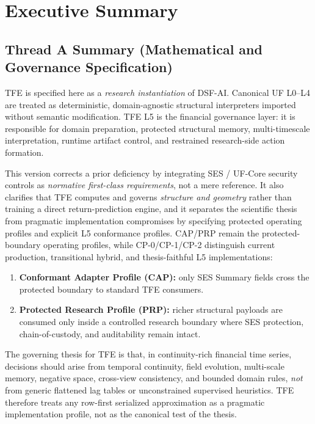 \documentclass[11pt]{report}
\begin{document}
\tableofcontents
\clearpage

\chapter*{Executive Summary}

\section*{Thread A Summary (Mathematical and Governance Specification)}
TFE is specified here as a \emph{research instantiation} of DSF-AI. Canonical UF L0--L4 are treated as deterministic, domain-agnostic structural interpreters imported without semantic modification. TFE L5 is the financial governance layer: it is responsible for domain preparation, protected structural memory, multi-timescale interpretation, runtime artifact control, and restrained research-side action formation.

This version corrects a prior deficiency by integrating SES / UF-Core security controls as \emph{normative first-class requirements}, not a mere reference. It also clarifies that TFE computes and governs \emph{structure and geometry} rather than training a direct return-prediction engine, and it separates the scientific thesis from pragmatic implementation compromises by specifying protected operating profiles and explicit L5 conformance profiles. CAP/PRP remain the protected-boundary operating profiles, while CP-0/CP-1/CP-2 distinguish current production, transitional hybrid, and thesis-faithful L5 implementations:
\begin{enumerate}[leftmargin=1.2cm]
    \item \textbf{Conformant Adapter Profile (CAP):} only SES Summary fields cross the protected boundary to standard TFE consumers.
    \item \textbf{Protected Research Profile (PRP):} richer structural payloads are consumed only inside a controlled research boundary where SES protection, chain-of-custody, and auditability remain intact.
\end{enumerate}

The governing thesis for TFE is that, in continuity-rich financial time series, decisions should arise from temporal continuity, field evolution, multi-scale memory, negative space, cross-view consistency, and bounded domain rules, \emph{not} from generic flattened lag tables or unconstrained supervised heuristics. TFE therefore treats any row-first serialized approximation as a pragmatic implementation profile, not as the canonical test of the thesis.
\end{document}
